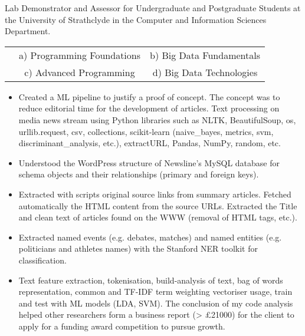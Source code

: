 {
{\begin{flushleft}
Lab Demonstrator and Assessor for Undergraduate and Postgraduate Students at the University of Strathclyde in the Computer and Information Sciences Department. 
\begin{itemize}
\begin{tabular}{ccc}
& a)  \raggedleft Programming Foundations & b) Big Data Fundamentals\\
& c)  \raggedleft Advanced Programming & d) Big Data Technologies\\
\end{tabular}
\end{itemize}
\end{flushleft} } }

{
{\begin{flushleft}
\begin{itemize}
    \item Created a ML pipeline to justify a proof of concept. The concept was to reduce editorial time for the development of articles. Text processing on media news stream using Python libraries such as NLTK, BeautifulSoup, os, urllib.request, csv, collections, scikit-learn (naive\_bayes, metrics, svm, discriminant\_analysis, etc.), extractURL, Pandas, NumPy, random, etc. 
    \item Understood the WordPress structure of Newsline's MySQL database for schema objects and their relationships (primary and foreign keys).
    \item Extracted with scripts original source links from summary articles. Fetched automatically the HTML content from the source URLs. Extracted the Title and clean text of articles found on the WWW (removal of HTML tags, etc.).
    \item Extracted named events (e.g. debates, matches) and named entities (e.g. politicians and athletes names) with the Stanford NER toolkit for classification. 
    \item Text feature extraction, tokenisation, build-analysis of text, bag of words representation, common and TF-IDF term weighting vectoriser usage, train and test with ML models (LDA, SVM). The conclusion of my code analysis helped other researchers form a business report (> £21000) for the client to apply for a funding award competition to pursue growth. 
\end{itemize}
\end{flushleft} } }

